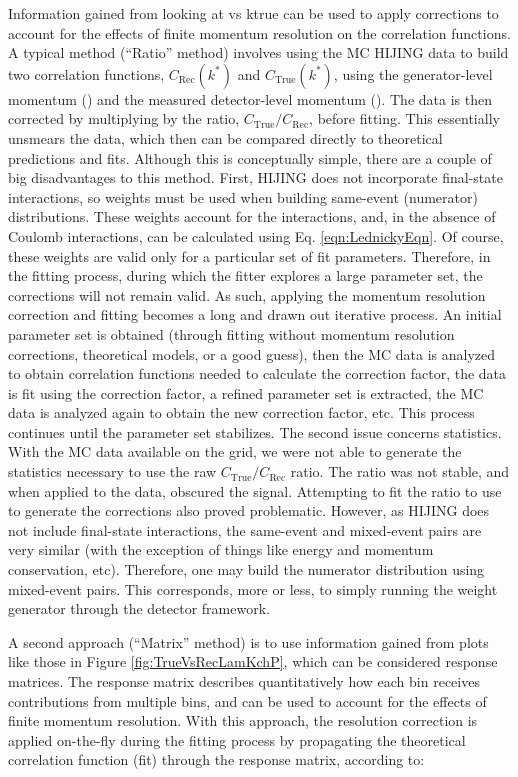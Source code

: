 \documentclass[../AnalysisNoteJBuxton.tex]{subfiles}
\begin{document}
Information gained from looking at \krec vs ktrue can be used to apply corrections to account for the effects of finite momentum resolution on the correlation functions.
A typical method (``Ratio'' method) involves using the MC HIJING data to build two correlation functions, $C_{\mathrm{Rec}}(k^{*})$ and $C_{\mathrm{True}}(k^{*})$, using the generator-level momentum (\ktrue) and the measured detector-level momentum (\krec).
The data is then corrected by multiplying by the ratio, $C_{\mathrm{True}}/C_{\mathrm{Rec}}$, before fitting.
This essentially unsmears the data, which then can be compared directly to theoretical predictions and fits.
Although this is conceptually simple, there are a couple of big disadvantages to this method.
First, HIJING does not incorporate final-state interactions, so weights must be used when building same-event (numerator) distributions.
These weights account for the interactions, and, in the absence of Coulomb interactions, can be calculated using Eq. \ref{eqn:LednickyEqn}.
Of course, these weights are valid only for a particular set of fit parameters.
Therefore, in the fitting process, during which the fitter explores a large parameter set, the corrections will not remain valid.
As such, applying the momentum resolution correction and fitting becomes a long and drawn out iterative process.
An initial parameter set is obtained (through fitting without momentum resolution corrections, theoretical models, or a good guess), then the MC data is analyzed to obtain correlation functions needed to calculate the correction factor, the data is fit using the correction factor, a refined parameter set is extracted, the MC data is analyzed again to obtain the new correction factor, etc.
This process continues until the parameter set stabilizes.
The second issue concerns statistics.
With the MC data available on the grid, we were not able to generate the statistics necessary to use the raw $C_{\mathrm{True}}/C_{\mathrm{Rec}}$ ratio.
The ratio was not stable, and when applied to the data, obscured the signal.
Attempting to fit the ratio to use to generate the corrections also proved problematic.
However, as HIJING does not include final-state interactions, the same-event and mixed-event pairs are very similar (with the exception of things like energy and momentum conservation, etc).
Therefore, one may build the numerator distribution using mixed-event pairs.
This corresponds, more or less, to simply running the weight generator through the detector framework.

A second approach (``Matrix'' method) is to use information gained from plots like those in Figure \ref{fig:TrueVsRecLamKchP}, which can be considered response matrices.
The response matrix describes quantitatively how each \krec bin receives contributions from multiple \ktrue bins, and can be used to account for the effects of finite momentum resolution.
With this approach, the resolution correction is applied on-the-fly during the fitting process by propagating the theoretical correlation function (fit) through the response matrix, according to:  
\end{document}
